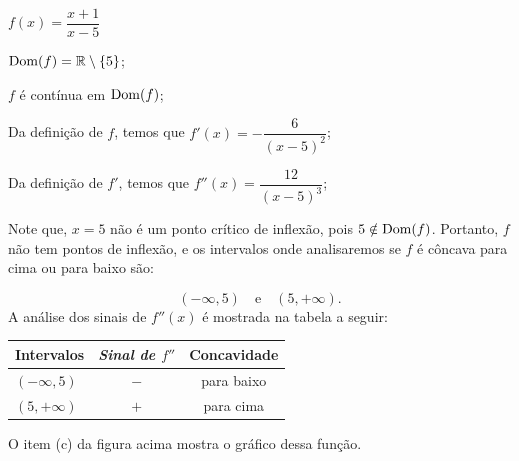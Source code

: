 \cleardoublepage\documentclass[../main.tex]{subfiles}
\begin{document}
\begin{compactenum}[a)]
\item \(f(x)=\dfrac{x+1}{x-5}\)

\begin{solution}
\begin{compactenum}[i.]
\item \({\rm Dom}(f)=\mathbb{R}\setminus \{5\}\);
\item \(f\) é contínua em \({\rm Dom}(f)\);
\item Da definição de \(f\), temos que \(f'(x)=- \dfrac{6}{(x-5)^2}\);
\item Da definição de \(f'\), temos que \(f''(x)=\dfrac{12}{(x-5)^3}\);

Note que, \( x=5\) não é um ponto crítico de inflexão, pois \( 5 \notin {\rm Dom}(f)\). Portanto, \(f\) não tem pontos de inflexão, e os intervalos onde analisaremos se \(f\) é côncava para cima ou para baixo são:

\[ (-\infty, 5)\quad \mbox{e} \quad \left(5,+\infty\right). \]
A análise dos sinais de \(f''(x)\) é mostrada na tabela a seguir:
\begin{center}
  \begin{tabular}{l|c|c}
  \toprule
    \textbf{Intervalos} &	\emph{Sinal de \(f''\)} &	\textbf{Concavidade}\\\hline
\((-\infty, 5)\) &\(-\)&para baixo\\\hline
  \((5,+\infty)\) & \(+\) & para cima\\
    \bottomrule
  \end{tabular}
  \end{center}
\end{compactenum}
O item (c) da figura acima mostra o gráfico dessa função.
\end{solution}


\end{compactenum}
\end{document}
